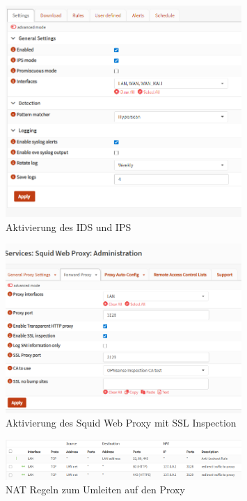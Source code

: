 \documentclass[12pt]{scrreprt}
\begin{document}
\begin{thebibliography}{99}
\begin{figure}[htbp]
	\centering
	\includegraphics[width=0.8\textwidth]{IPSopnsense.png}
	\caption{Aktivierung des IDS und IPS}
	\label{fig:ipsopn1} %
\end{figure}

\begin{figure}[htbp]
	\centering
	\includegraphics[width=0.8\textwidth]{squidproxy.png}
	\caption{Aktivierung des Squid Web Proxy mit SSL Inspection}
	\label{fig:squidproxy} %
\end{figure}

\begin{figure}[htbp]
	\centering
	\includegraphics[width=0.8\textwidth]{proxyNAT.png}
	\caption{NAT Regeln zum Umleiten auf den Proxy}
	\label{fig:squidproxy} %
\end{figure}


\end{thebibliography}
\end{document}
